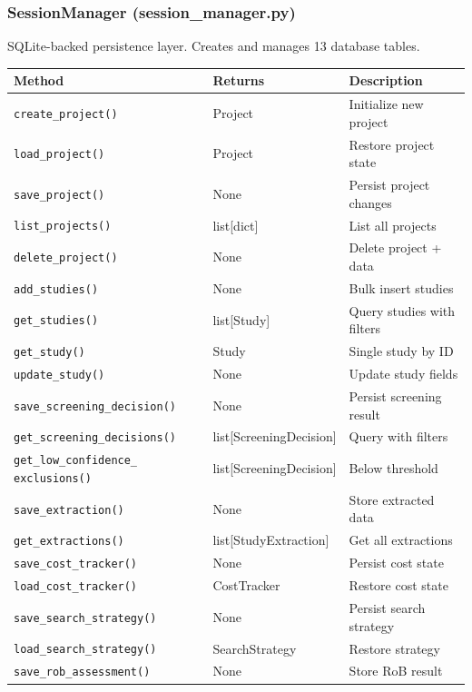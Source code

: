 \documentclass[11pt,a4paper]{article}
\begin{document}
\subsubsection{SessionManager (session\_manager.py)}

SQLite-backed persistence layer. Creates and manages 13 database tables.

\begin{table}[H]
\centering\small
\begin{tabular}{p{5cm}p{3.5cm}p{4.5cm}}
\toprule
\textbf{Method} & \textbf{Returns} & \textbf{Description} \\
\midrule
\texttt{create\_project()} & Project & Initialize new project \\
\texttt{load\_project()} & Project & Restore project state \\
\texttt{save\_project()} & None & Persist project changes \\
\texttt{list\_projects()} & list[dict] & List all projects \\
\texttt{delete\_project()} & None & Delete project + data \\
\texttt{add\_studies()} & None & Bulk insert studies \\
\texttt{get\_studies()} & list[Study] & Query studies with filters \\
\texttt{get\_study()} & Study & Single study by ID \\
\texttt{update\_study()} & None & Update study fields \\
\texttt{save\_screening\_decision()} & None & Persist screening result \\
\texttt{get\_screening\_decisions()} & list[ScreeningDecision] & Query with filters \\
\texttt{get\_low\_confidence\_ exclusions()} & list[ScreeningDecision] & Below threshold \\
\texttt{save\_extraction()} & None & Store extracted data \\
\texttt{get\_extractions()} & list[StudyExtraction] & Get all extractions \\
\texttt{save\_cost\_tracker()} & None & Persist cost state \\
\texttt{load\_cost\_tracker()} & CostTracker & Restore cost state \\
\texttt{save\_search\_strategy()} & None & Persist search strategy \\
\texttt{load\_search\_strategy()} & SearchStrategy & Restore strategy \\
\texttt{save\_rob\_assessment()} & None & Store RoB result \\

\end{tabular}
\end{table}
\end{document}
